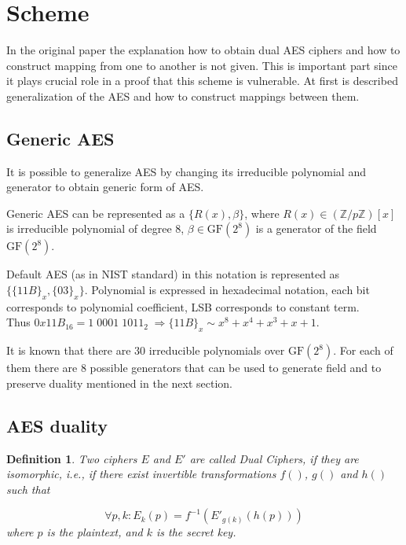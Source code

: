 \documentclass[11pt,oneside,final]{fithesis2}
\newtheorem{mydef}{Definition}
\newcommand{\gfe}{\ensuremath{\text{GF}\left(2^8\right)}}
\begin{document}
    
    \section{Scheme}

    In the original paper \citep{Karroumi:2010:PWA:2041036.2041060} the explanation how to obtain dual AES ciphers and how to construct mapping from one 
    to another is not given. This is
    important part since it plays crucial role in a proof that this scheme is vulnerable. At first is described generalization of the AES and how to construct
    mappings between them. 

	\subsection{Generic AES}
	It is possible to generalize AES by changing its irreducible polynomial and generator to obtain generic form of AES.

	Generic AES can be represented as a $\{R(x), \beta \}$, where $R(x) \in \left(\mathbb{Z}/p\mathbb{Z}\right)[x]$ is 
	irreducible polynomial of degree 8, $\beta \in \gfe$ is a generator of the field $\gfe$.

	Default AES (as in NIST standard) in this notation is represented as $\{\{11B\}_x, \{03\}_x\}$. Polynomial is expressed
	in hexadecimal notation, each bit corresponds to polynomial coefficient, LSB corresponds to constant term.\\
	Thus $0x11B_{16} = 1 \; 0001 \; 1011_{2} \; \Rightarrow \{11B\}_x \sim x^8+x^4+x^3+x+1$.

	It is known that there are $30$ irreducible polynomials over $\gfe$. For each of them there are $8$ possible
	generators that can be used to generate field and to preserve duality mentioned in the next section.

	\subsection{AES duality}

	\begin{mydef}\label{def:dual_cipher}
	Two ciphers $E$ and $E'$ are called Dual Ciphers, if they are
	isomorphic, i.e., if there exist invertible transformations $f()$, $g()$ and $h()$ such
	that

	\begin{equation} 
	\forall p, k: E_k(p) = f^{-1}\left(E'_{g(k)}(h(p))\right)
	\end{equation}
	where $p$ is the plaintext, and $k$ is the secret key.
	\end{mydef}
\end{document}
